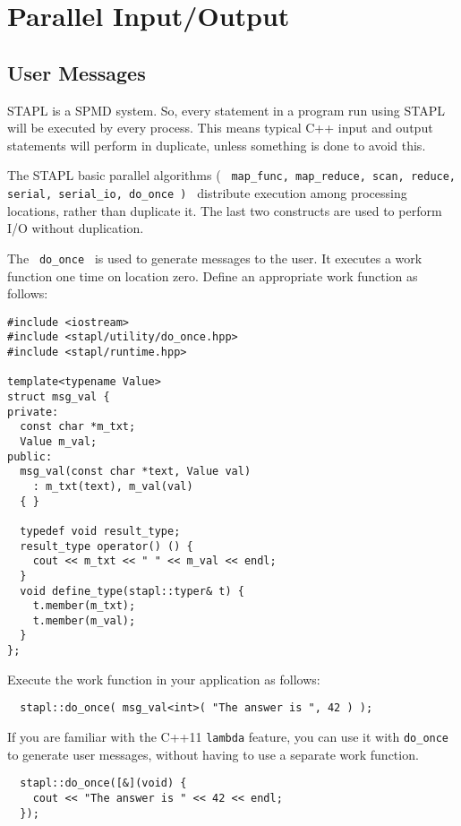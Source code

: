 \chapter{Parallel Input/Output}

\section{User Messages}

STAPL is a SPMD system.  So, every statement in a program
run using STAPL will be executed by every process.  This means typical
C++ input and output statements will perform in duplicate, unless something 
is done to avoid this.

The STAPL basic parallel algorithms ( \texttt{
map\_func, map\_reduce, scan, reduce, serial, serial\_io, do\_once ) }
distribute execution among processing locations, rather than duplicate it.
The last two constructs are used to perform I/O without duplication.

The \texttt{ do\_once }
is used to generate messages to the user.  It executes a work function one
time on location zero.  Define an appropriate work function as follows:

\begin{verbatim}
#include <iostream> 
#include <stapl/utility/do_once.hpp>
#include <stapl/runtime.hpp> 

template<typename Value>
struct msg_val {
private:
  const char *m_txt;
  Value m_val;
public:
  msg_val(const char *text, Value val)
    : m_txt(text), m_val(val)
  { }

  typedef void result_type;
  result_type operator() () {
    cout << m_txt << " " << m_val << endl;
  }
  void define_type(stapl::typer& t) {
    t.member(m_txt);
    t.member(m_val);
  }
};
\end{verbatim}

Execute the work function in your application as follows:

\begin{verbatim}
  stapl::do_once( msg_val<int>( "The answer is ", 42 ) );
\end{verbatim}

If you are familiar with the C++11 \texttt{lambda} feature, you can use it
with \texttt{do\_once} to generate user messages, without having to use
a separate work function.

\begin{verbatim}
  stapl::do_once([&](void) {
    cout << "The answer is " << 42 << endl;
  });
\end{verbatim}

